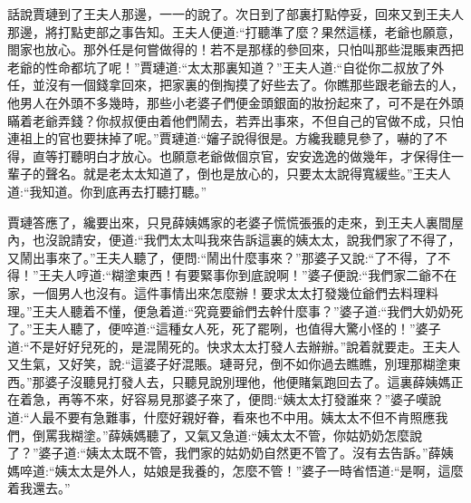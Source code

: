 


\begin{parag}
    話說賈璉到了王夫人那邊，一一的說了。次日到了部裏打點停妥，回來又到王夫人那邊，將打點吏部之事告知。王夫人便道:“打聽準了麼？果然這樣，老爺也願意，閤家也放心。那外任是何嘗做得的！若不是那樣的參回來，只怕叫那些混賬東西把老爺的性命都坑了呢！”賈璉道:“太太那裏知道？”王夫人道:“自從你二叔放了外任，並沒有一個錢拿回來，把家裏的倒掏摸了好些去了。你瞧那些跟老爺去的人，他男人在外頭不多幾時，那些小老婆子們便金頭銀面的妝扮起來了，可不是在外頭瞞着老爺弄錢？你叔叔便由着他們鬧去，若弄出事來，不但自己的官做不成，只怕連祖上的官也要抹掉了呢。”賈璉道:“嬸子說得很是。方纔我聽見參了，嚇的了不得，直等打聽明白才放心。也願意老爺做個京官，安安逸逸的做幾年，才保得住一輩子的聲名。就是老太太知道了，倒也是放心的，只要太太說得寬緩些。”王夫人道:“我知道。你到底再去打聽打聽。”
\end{parag}


\begin{parag}
    賈璉答應了，纔要出來，只見薛姨媽家的老婆子慌慌張張的走來，到王夫人裏間屋內，也沒說請安，便道:“我們太太叫我來告訴這裏的姨太太，說我們家了不得了，又鬧出事來了。”王夫人聽了，便問:“鬧出什麼事來？”那婆子又說:“了不得，了不得！”王夫人哼道:“糊塗東西！有要緊事你到底說啊！”婆子便說:“我們家二爺不在家，一個男人也沒有。這件事情出來怎麼辦！要求太太打發幾位爺們去料理料理。”王夫人聽着不懂，便急着道:“究竟要爺們去幹什麼事？”婆子道:“我們大奶奶死了。”王夫人聽了，便啐道:“這種女人死，死了罷咧，也值得大驚小怪的！”婆子道:“不是好好兒死的，是混鬧死的。快求太太打發人去辦辦。”說着就要走。王夫人又生氣，又好笑，說:“這婆子好混賬。璉哥兒，倒不如你過去瞧瞧，別理那糊塗東西。”那婆子沒聽見打發人去，只聽見說別理他，他便賭氣跑回去了。這裏薛姨媽正在着急，再等不來，好容易見那婆子來了，便問:“姨太太打發誰來？”婆子嘆說道:“人最不要有急難事，什麼好親好眷，看來也不中用。姨太太不但不肯照應我們，倒罵我糊塗。”薛姨媽聽了，又氣又急道:“姨太太不管，你姑奶奶怎麼說了？”婆子道:“姨太太既不管，我們家的姑奶奶自然更不管了。沒有去告訴。”薛姨媽啐道:“姨太太是外人，姑娘是我養的，怎麼不管！”婆子一時省悟道:“是啊，這麼着我還去。”
\end{parag}


